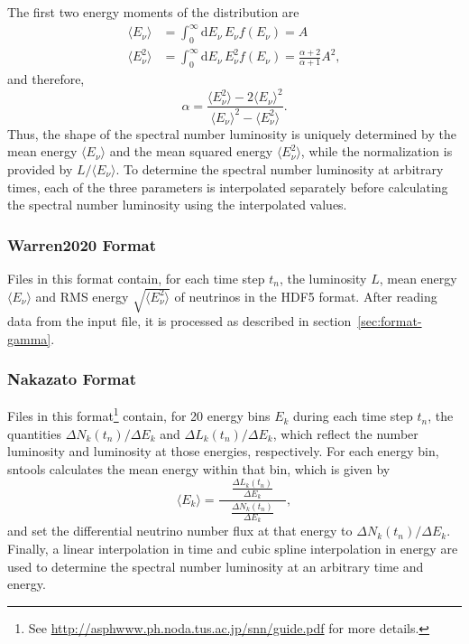 \documentclass[11pt, oneside]{article}
\renewcommand{\d}{\mathrm{d}}
\newcommand{\mean}[1]{\ensuremath{\langle #1 \rangle}}
\begin{document}
The first two energy moments of the distribution are
\begin{align}
\mean{E_\nu}	&= \int_0^\infty \d E_\nu\, E_\nu f(E_\nu) = A\\
\mean{E_\nu^2}&= \int_0^\infty \d E_\nu\, E_\nu^2 f(E_\nu) = \frac{\alpha + 2}{\alpha + 1} A^2,
\end{align}
and therefore,
\begin{equation}
\alpha = \frac{\mean{E_\nu^2} - 2 \mean{E_\nu}^2}{\mean{E_\nu}^2 - \mean{E_\nu^2}}.
\end{equation}
Thus, the shape of the spectral number luminosity is uniquely determined by the mean energy \mean{E_\nu} and the mean squared energy \mean{E_\nu^2}, while the normalization is provided by $L / \mean{E_\nu}$.
To determine the spectral number luminosity at arbitrary times, each of the three parameters is interpolated separately before calculating the spectral number luminosity using the interpolated values.

\subsubsection{Warren2020 Format}
Files in this format contain, for each time step $t_n$, the luminosity $L$, mean energy $\mean{E_\nu}$ and RMS energy $\sqrt{\mean{E_\nu^2}}$ of neutrinos in the HDF5 format.
After reading data from the input file, it is processed as described in section~\ref{sec:format-gamma}.

\subsubsection{Nakazato Format}
Files in this format\footnote{See \url{http://asphwww.ph.noda.tus.ac.jp/snn/guide.pdf} for more details.} contain, for 20 energy bins $E_k$ during each time step $t_n$, the quantities $\Delta N_k (t_n) / \Delta E_k$ and $\Delta L_k (t_n) / \Delta E_k$, which reflect the number luminosity and luminosity at those energies, respectively.
For each energy bin, sntools calculates the mean energy within that bin, which is given by
\begin{equation}
\mean{E_k} = \frac{\quad  \frac{\Delta L_k (t_n)}{\Delta E_k}  \quad}{  \frac{\Delta N_k (t_n)}{\Delta E_k}  },
\end{equation}
and set the differential neutrino number flux at that energy to $\Delta N_k (t_n) / \Delta E_k$.
Finally, a linear interpolation in time and cubic spline interpolation in energy are used to determine the spectral number luminosity at an arbitrary time and energy. %
\end{document}
